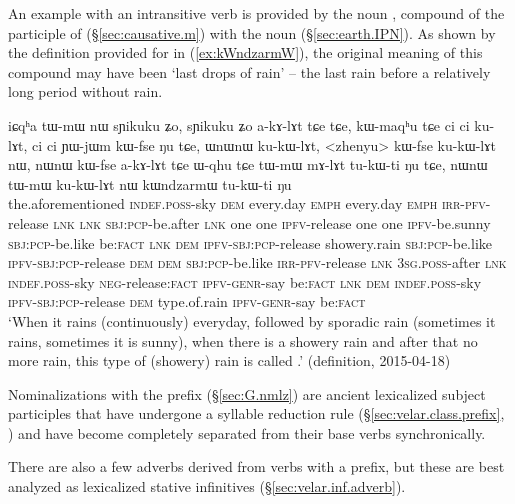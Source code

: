 An example with an intransitive verb is provided by the noun , compound of the participle of  (§\ref{sec:causative.m}) with the noun  (§\ref{sec:earth.IPN}). As shown by the definition provided for  in (\ref{ex:kWndzarmW}), the original meaning of this compound may have been `last drops of rain' -- the last rain before a relatively long period without rain.

\begin{exe}
\ex \label{ex:kWndzarmW}
\gll  iɕqʰa tɯ-mɯ nɯ sɲikuku ʑo, sɲikuku ʑo a-kɤ-lɤt tɕe tɕe, kɯ-maqʰu tɕe ci ci ku-lɤt, ci ci ɲɯ-jɯm kɯ-fse ŋu tɕe, ɯnɯnɯ ku-kɯ-lɤt, <zhenyu> kɯ-fse ku-kɯ-lɤt nɯ, nɯnɯ kɯ-fse a-kɤ-lɤt tɕe ɯ-qhu tɕe tɯ-mɯ mɤ-lɤt tu-kɯ-ti ŋu tɕe, nɯnɯ tɯ-mɯ ku-kɯ-lɤt nɯ kɯndzarmɯ tu-kɯ-ti ŋu \\
the.aforementioned \textsc{indef}.\textsc{poss}-sky \textsc{dem} every.day \textsc{emph} every.day \textsc{emph} \textsc{irr}-\textsc{pfv}-release \textsc{lnk} \textsc{lnk} \textsc{sbj}:\textsc{pcp}-be.after \textsc{lnk} one one \textsc{ipfv}-release one one \textsc{ipfv}-be.sunny \textsc{sbj}:\textsc{pcp}-be.like be:\textsc{fact} \textsc{lnk} \textsc{dem} \textsc{ipfv}-\textsc{sbj}:\textsc{pcp}-release showery.rain \textsc{sbj}:\textsc{pcp}-be.like \textsc{ipfv}-\textsc{sbj}:\textsc{pcp}-release  \textsc{dem} \textsc{dem} \textsc{sbj}:\textsc{pcp}-be.like \textsc{irr}-\textsc{pfv}-release \textsc{lnk} \textsc{3sg}.\textsc{poss}-after \textsc{lnk} \textsc{indef}.\textsc{poss}-sky \textsc{neg}-release:\textsc{fact} \textsc{ipfv}-\textsc{genr}-say be:\textsc{fact} \textsc{lnk} \textsc{dem} \textsc{indef}.\textsc{poss}-sky \textsc{ipfv}-\textsc{sbj}:\textsc{pcp}-release \textsc{dem} type.of.rain \textsc{ipfv}-\textsc{genr}-say be:\textsc{fact} \\
\glt `When it rains (continuously) everyday, followed by sporadic rain (sometimes it rains, sometimes it is sunny), when there is a showery rain and after that no more rain, this type of (showery) rain is called .' (definition, 2015-04-18)
\end{exe}

Nominalizations with the  prefix (§\ref{sec:G.nmlz}) are ancient lexicalized subject participles that have undergone a syllable reduction rule (§\ref{sec:velar.class.prefix}, \citealt[6]{jacques14antipassive}) and have become completely separated from their base verbs synchronically.

There are also a few adverbs derived from verbs with a  prefix, but these are best analyzed as lexicalized stative infinitives (§\ref{sec:velar.inf.adverb}).

